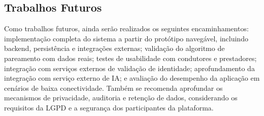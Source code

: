 \documentclass[12pt, a4paper]{article}
\begin{document}
\subsection{Trabalhos Futuros}
Como trabalhos futuros, ainda serão realizados os seguintes encaminhamentos: implementação completa do sistema a partir do protótipo navegável, incluindo backend, persistência e integrações externas; validação do algoritmo de pareamento com dados reais; testes de usabilidade com condutores e prestadores; integração com serviços externos de validação de identidade; aprofundamento da integração com serviço externo de IA; e avaliação do desempenho da aplicação em cenários de baixa conectividade. Também se recomenda aprofundar os mecanismos de privacidade, auditoria e retenção de dados, considerando os requisitos da LGPD \cite{brasil_lgpd2018} e a segurança dos participantes da plataforma.



\end{document}

